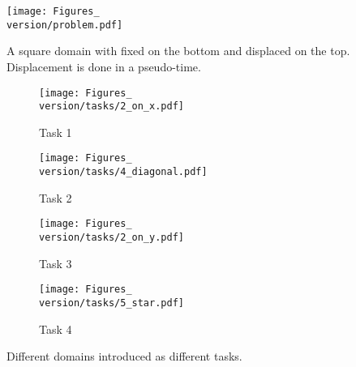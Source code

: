 \begin{figure}
  \centering
  \texttt{[image: Figures\_\\version/problem.pdf]}
  \caption{A square domain with fixed on the bottom and displaced on the top. Displacement is done in a pseudo-time.}
  \label{fig:problem}
\end{figure}
\begin{figure}
  \centering
  \begin{subfigure}[b]{0.22\textwidth}
    \centering
    \texttt{[image: Figures\_\\version/tasks/2\_on\_x.pdf]}
    \caption{Task 1}
    \label{fig:task1}
  \end{subfigure}
  \hfill
  \begin{subfigure}[b]{0.22\textwidth}
    \centering
    \texttt{[image: Figures\_\\version/tasks/4\_diagonal.pdf]}
    \caption{Task 2}
    \label{fig:task2}
  \end{subfigure}
  \hfill
  \begin{subfigure}[b]{0.22\textwidth}
    \centering
    \texttt{[image: Figures\_\\version/tasks/2\_on\_y.pdf]}
    \caption{Task 3}
    \label{fig:task3}
  \end{subfigure}
  \hfill
  \begin{subfigure}[b]{0.22\textwidth}
    \centering
    \texttt{[image: Figures\_\\version/tasks/5\_star.pdf]}
    \caption{Task 4}
    \label{fig:task4}
  \end{subfigure}
  \caption{Different domains introduced as different tasks.}
  \label{fig:tasks}
\end{figure}

